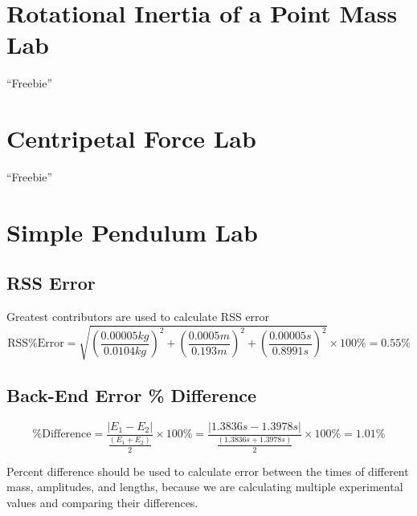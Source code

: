 \documentclass{report}
\begin{document}
\chapter*{\centering Rotational Inertia of a Point Mass Lab}
\begin{center}
  \Huge ``Freebie''
\end{center}

\chapter*{\centering Centripetal Force Lab}
\begin{center}
  \Huge ``Freebie''
\end{center}


\chapter*{Simple Pendulum Lab}

\section*{RSS Error}

\begin{center}
  \noindent Greatest contributors are used to calculate RSS error
  \begin{equation*}
      \text{RSS\% Error} = \sqrt{ \left( \frac{0.00005kg}{0.0104kg} \right)^2 
      + \left( \frac{0.0005 m}{0.193 m} \right)^2 + \left( \frac{0.00005 s}{0.8991 s} \right)^2}
      \times 100\% = 0.55\%
  \end{equation*}
\end{center}

\section*{Back-End Error \% Difference}

\begin{center}
  \begin{equation*}
    \text{\% Difference} = \frac{|E_1 - E_2|}{\frac{(E_1 + E_2)}{2}} \times 100\% 
    = \frac{|1.3836 s - 1.3978 s|}{\frac{(1.3836 s + 1.3978 s)}{2}} \times 100\% = 1.01\%
  \end{equation*}
\end{center}

\noindent Percent difference should be used to calculate error between the times of different mass, amplitudes, and lengths, 
because we are calculating multiple experimental values and comparing their differences. 
\end{document}

